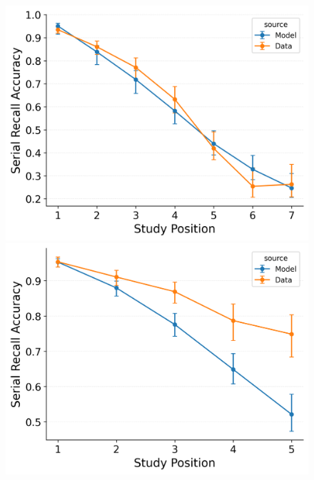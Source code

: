 \documentclass[
  man,
  floatsintext,
  longtable,
  nolmodern,
  notxfonts,
  notimes,
  draftfirst,
  colorlinks=true,linkcolor=blue,citecolor=blue,urlcolor=blue]{apa7}
\begin{document}
\begin{figure}
%
\begin{minipage}{0.33\linewidth}
\includegraphics{figures/Gordon2021_BaseCRU_with_ContextTerm_Confusable_Fitting_srac_LL7.png}\end{minipage}%
\newline
\begin{minipage}{0.33\linewidth}
\includegraphics{figures/Gordon2021_CRU_with_Pre-Expt_and_Primacy__and_ContextTerm_Confusable_Fitting_srac_LL5.png}\end{minipage}%
%
\begin{minipage}{0.33\linewidth}

\end{minipage}
\end{figure}
\end{document}
